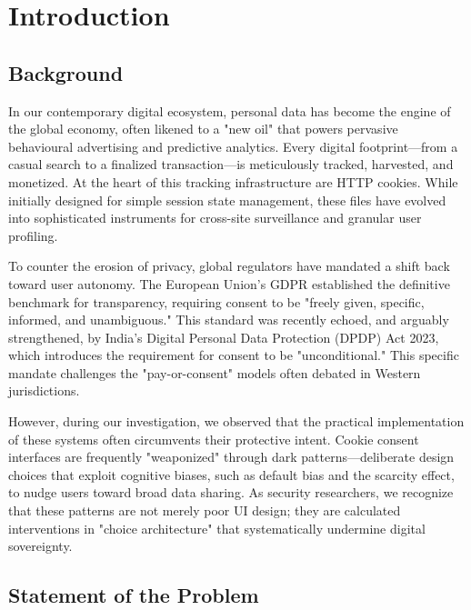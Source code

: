 \documentclass[12pt,a4paper]{report}
\begin{document}
\chapter{Introduction}

\section{Background}

In our contemporary digital ecosystem, personal data has become the engine of the global economy, often likened to a "new oil" that powers pervasive behavioural advertising and predictive analytics. Every digital footprint—from a casual search to a finalized transaction—is meticulously tracked, harvested, and monetized. At the heart of this tracking infrastructure are HTTP cookies. While initially designed for simple session state management, these files have evolved into sophisticated instruments for cross-site surveillance and granular user profiling.

To counter the erosion of privacy, global regulators have mandated a shift back toward user autonomy. The European Union’s GDPR established the definitive benchmark for transparency, requiring consent to be "freely given, specific, informed, and unambiguous." This standard was recently echoed, and arguably strengthened, by India’s Digital Personal Data Protection (DPDP) Act 2023, which introduces the requirement for consent to be "unconditional." This specific mandate challenges the "pay-or-consent" models often debated in Western jurisdictions.

However, during our investigation, we observed that the practical implementation of these systems often circumvents their protective intent. Cookie consent interfaces are frequently "weaponized" through dark patterns—deliberate design choices that exploit cognitive biases, such as default bias and the scarcity effect, to nudge users toward broad data sharing. As security researchers, we recognize that these patterns are not merely poor UI design; they are calculated interventions in "choice architecture" that systematically undermine digital sovereignty.

\section{Statement of the Problem}
\end{document}

